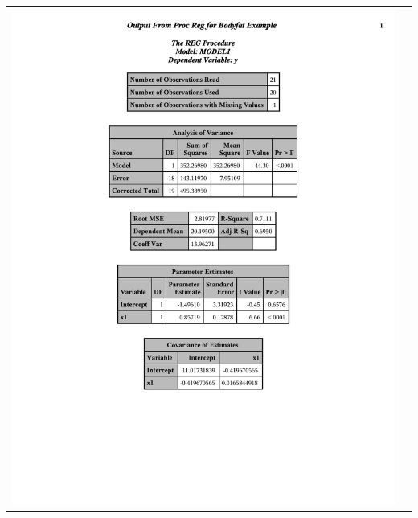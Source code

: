 \begin{center}
\begin{tabular}{cc}
\includegraphics[page=2,scale=0.6,trim=40mm 30mm 20mm 10mm]{bodyfatexample}\\
\end{tabular}
\begin{tabular}{cc}

\end{tabular}
\end{center}
